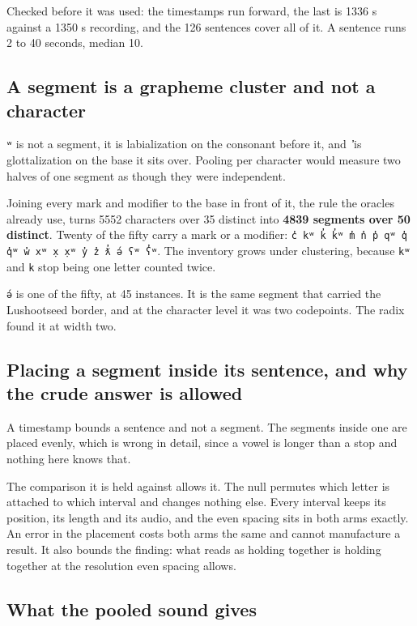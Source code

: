 Checked before it was used: the timestamps run forward, the last is 1336 s against a 1350 s
recording, and the 126 sentences cover all of it. A sentence runs 2 to 40 seconds, median 10.

\subsection{A segment is a grapheme cluster and not a character}

\texttt{ʷ} is not a segment, it is labialization on the consonant before it, and \texttt{̓} is
glottalization on the base it sits over. Pooling per character would measure two halves of one
segment as though they were independent.

Joining every mark and modifier to the base in front of it, the rule the oracles already
use, turns 5552 characters over 35 distinct into \textbf{4839 segments over 50 distinct}. Twenty of
the fifty carry a mark or a modifier: \texttt{c̓ kʷ k̓ k̓ʷ m̓ n̓ p̓ qʷ q̓ q̓ʷ w̓ xʷ x̣ x̣ʷ y̓ z̓ ƛ̓ ə́ ʕʷ ʕ̓ʷ}.
The inventory grows under clustering, because \texttt{kʷ} and \texttt{k} stop
being one letter counted twice.

\texttt{ə́} is one of the fifty, at 45 instances. It is the same segment that carried the Lushootseed
border, and at the character level it was two codepoints. The radix found it at width
two.

\subsection{Placing a segment inside its sentence, and why the crude answer is allowed}

A timestamp bounds a sentence and not a segment. The segments inside one are placed evenly, which is
wrong in detail, since a vowel is longer than a stop and nothing here knows that.

The comparison it is held against allows it. The null permutes which letter is attached to
which interval and changes nothing else. Every interval keeps its position, its length and its
audio, and the even spacing sits in both arms exactly. An error in the placement costs both arms the
same and cannot manufacture a result. It also bounds the finding: what reads as holding together is
holding together at the resolution even spacing allows.

\subsection{What the pooled sound gives}

